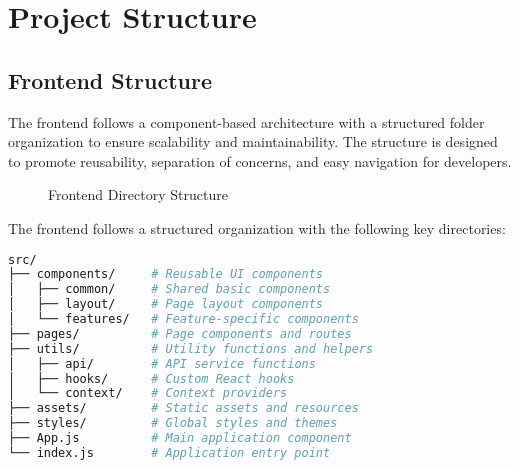 \documentclass[12pt,a4paper]{article}
\begin{document}
\section{Project Structure}

\subsection{Frontend Structure}
The frontend follows a component-based architecture with a structured folder organization to ensure scalability and maintainability. The structure is designed to promote reusability, separation of concerns, and easy navigation for developers.

\begin{figure}[H]
\centering
{}
\caption{Frontend Directory Structure}
\end{figure}

The frontend follows a structured organization with the following key directories:

\begin{lstlisting}[language=bash]
src/
├── components/     # Reusable UI components
│   ├── common/     # Shared basic components
│   ├── layout/     # Page layout components
│   └── features/   # Feature-specific components
├── pages/          # Page components and routes
├── utils/          # Utility functions and helpers
│   ├── api/        # API service functions
│   ├── hooks/      # Custom React hooks
│   └── context/    # Context providers
├── assets/         # Static assets and resources
├── styles/         # Global styles and themes
├── App.js          # Main application component
└── index.js        # Application entry point
\end{lstlisting}
\end{document}
